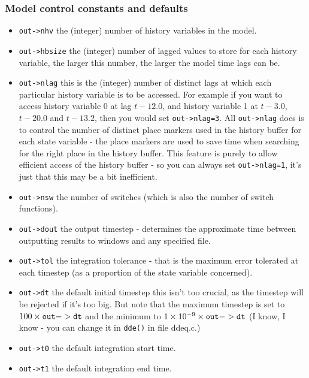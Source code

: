 \documentclass[10pt] {article}
\begin{document}
\subsubsection{Model control constants and defaults}
\begin{itemize}
\item \verb+out->nhv+ the (integer) number of history variables in the model.
\item \verb+out->hbsize+ the (integer) number of lagged values to store for each history %
variable, the larger this number, the larger the model time lags can be.
\item \verb+out->nlag+ this is the (integer) number of distinct lags at which each particular %
history variable is to be accessed. For example if you want to access history variable 0 at lag %
$t-12.0$, and history variable 1 at $t-3.0$, $t-20.0$ and $t-13.2$, then you would set %
\verb+out->nlag=3+. All \verb+out->nlag+ does is to control the number of distinct place markers %
used in the history buffer for each state variable - the place markers are used to save time when %
searching for the right place in the history buffer. This feature is purely to allow efficient %
access of the history buffer - so you can always set \verb+out->nlag=1+, it's just that this may %
be a bit inefficient. 
\item \verb+out->nsw+ the number of switches (which is also the number of switch functions). 
\item \verb+out->dout+ the output timestep - determines the approximate time between outputting %
results to windows and any specified file.  
\item \verb+out->tol+ the integration tolerance - that is the maximum error tolerated at each %
timestep (as a proportion of the state variable concerned).
\item \verb+out->dt+ the default initial timestep this isn't too crucial, as the timestep will be %
rejected if it's too big. But note that the maximum timestep is set to $100 \times {\tt out->dt} %
$ and the minimum to $1 \times 10^{-9} \times {\tt out->dt}$ (I know, I know - you can change it %
in {\tt dde()} in file ddeq.c.)
\item \verb+out->t0+ the default integration start time.
\item \verb+out->t1+ the default integration end time.
\end{itemize} 
\end{document}
